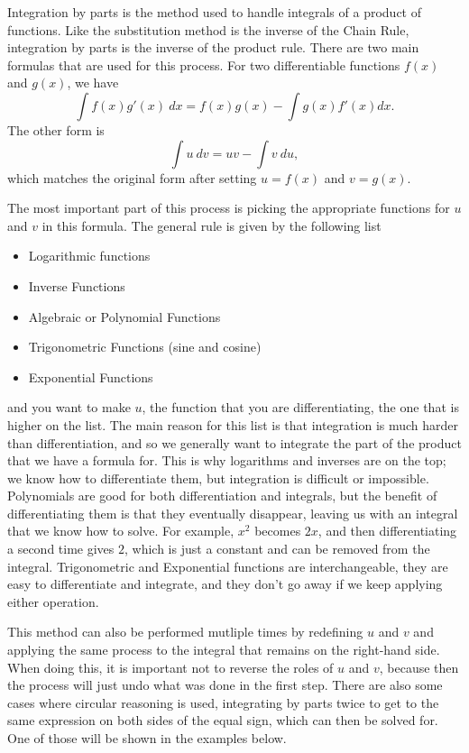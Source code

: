 \documentclass{ximera}
\begin{document}
Integration by parts is the method used to handle integrals of a product of functions. Like the substitution method is the inverse of the Chain Rule, integration by parts is the inverse of the product rule. There are two main formulas that are used for this process. For two differentiable functions $f(x)$ and $g(x)$, we have 
\[ 
    \int f(x) g'(x)\ dx = f(x)g(x) - \int g(x) f'(x) dx. 
\] 
The other form is 
\[ 
    \int u\ dv = uv - \int v\ du, 
\] 
which matches the original form after setting $u = f(x)$ and $v = g(x)$. 

The most important part of this process is picking the appropriate functions for $u$ and $v$ in this formula. The general rule is given by the following list
\begin{itemize}
    \item Logarithmic functions
    \item Inverse Functions
    \item Algebraic or Polynomial Functions
    \item Trigonometric Functions (sine and cosine)
    \item Exponential Functions
\end{itemize}
and you want to make $u$, the function that you are differentiating, the one that is higher on the list. The main reason for this list is that integration is much harder than differentiation, and so we generally want to integrate the part of the product that we have a formula for. This is why logarithms and inverses are on the top; we know how to differentiate them, but integration is difficult or impossible. Polynomials are good for both differentiation and integrals, but the benefit of differentiating them is that they eventually disappear, leaving us with an integral that we know how to solve. For example, $x^2$ becomes $2x$, and then differentiating a second time gives $2$, which is just a constant and can be removed from the integral. Trigonometric and Exponential functions are interchangeable, they are easy to differentiate and integrate, and they don't go away if we keep applying either operation.

This method can also be performed mutliple times by redefining $u$ and $v$ and applying the same process to the integral that remains on the right-hand side. When doing this, it is important not to reverse the roles of $u$ and $v$, because then the process will just undo what was done in the first step. There are also some cases where circular reasoning is used, integrating by parts twice to get to the same expression on both sides of the equal sign, which can then be solved for. One of those will be shown in the examples below.
\end{document}
